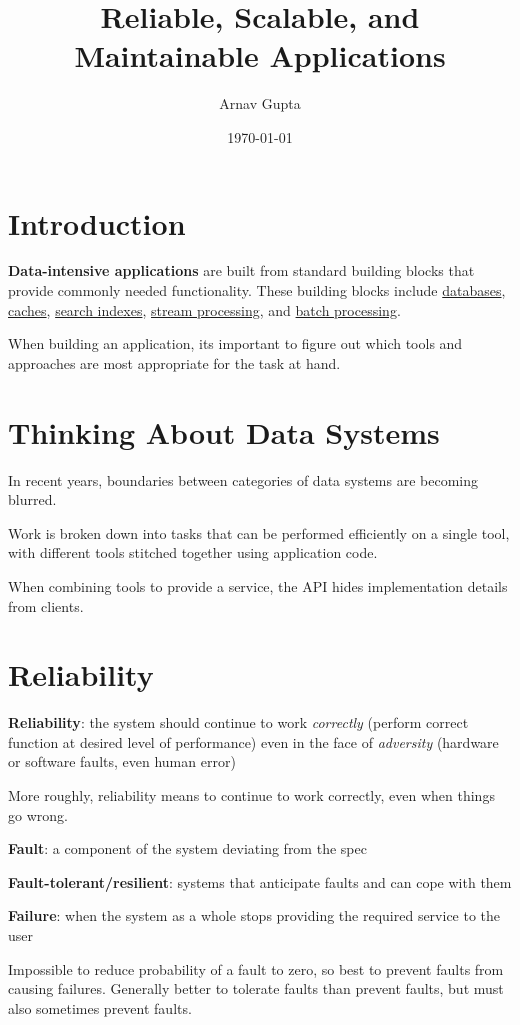 \documentclass[11pt]{article}
\author{Arnav Gupta}
\date{\today}
\title{Reliable, Scalable, and Maintainable Applications}
\begin{document}
\maketitle
\tableofcontents

\section{Introduction}
\label{sec:orgbfcfe6e}
\textbf{Data-intensive applications} are built from standard building blocks that provide commonly needed
functionality.
These building blocks include \uline{databases}, \uline{caches}, \uline{search indexes}, \uline{stream processing}, and
\uline{batch processing}.

When building an application, its important to figure out which tools and approaches are most appropriate
for the task at hand.
\section{Thinking About Data Systems}
\label{sec:org56a4134}
In recent years, boundaries between categories of data systems are becoming blurred.

Work is broken down into tasks that can be performed efficiently on a single tool, with different tools
stitched together using application code.

When combining tools to provide a service, the API hides implementation details from clients.
\section{Reliability}
\label{sec:org6d3175d}
\textbf{Reliability}: the system should continue to work \emph{correctly} (perform correct function at desired level
of performance) even in the face of \emph{adversity} (hardware or software faults, even human error)

More roughly, reliability means to continue to work correctly, even when things go wrong.

\textbf{Fault}: a component of the system deviating from the spec

\textbf{Fault-tolerant/resilient}: systems that anticipate faults and can cope with them

\textbf{Failure}: when the system as a whole stops providing the required service to the user

Impossible to reduce probability of a fault to zero, so best to prevent faults from causing failures.
Generally better to tolerate faults than prevent faults, but must also sometimes prevent faults.
\end{document}
